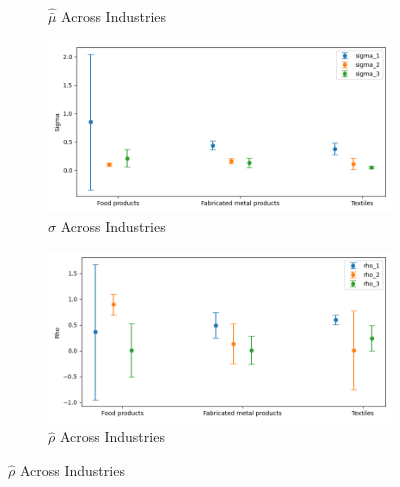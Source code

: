 \documentclass{article}
\begin{document}
\begin{figure}[ht!]
\begin{subfigure}[t]{0.32\textwidth}
        \caption{$\hat{\bar\mu}$ Across Industries}
    \end{subfigure}
    \begin{subfigure}[t]{0.32\textwidth}
        \centering
        \includegraphics[width=\textwidth]{figure/ar1_mixture_sigma_across_industries_m3.png}
        \caption{$\hat\sigma$ Across Industries}
    \end{subfigure}
    \begin{subfigure}[t]{0.32\textwidth}
        \centering
        \includegraphics[width=\textwidth]{figure/ar1_mixture_rho_across_industries_m3.png}
        \caption{$\hat\rho$ Across Industries}
    \end{subfigure}
\end{figure}
\end{document}
